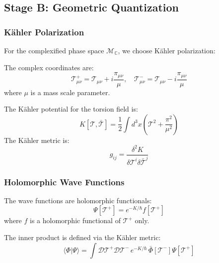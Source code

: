 \subsection{Stage B: Geometric Quantization}
\label{subsec:stageB_geometric}

\subsubsection{Kähler Polarization}

For the complexified phase space $\mathcal{M}_\mathbb{C}$, we choose Kähler polarization:

\begin{definition}
The complex coordinates are:
\begin{equation}
    \mathcal{T}^+_{\mu\nu} = \mathcal{T}_{\mu\nu} + i \frac{\pi_{\mu\nu}}{\mu}, \quad \mathcal{T}^-_{\mu\nu} = \mathcal{T}_{\mu\nu} - i \frac{\pi_{\mu\nu}}{\mu}
\end{equation}
where $\mu$ is a mass scale parameter.
\end{definition}

\begin{theorem}
The Kähler potential for the torsion field is:
\begin{equation}
    K[\mathcal{T}, \bar{\mathcal{T}}] = \frac{1}{2} \int d^3x \left( \mathcal{T}^2 + \frac{\pi^2}{\mu^2} \right)
\end{equation}
The Kähler metric is:
\begin{equation}
    g_{ij} = \frac{\delta^2 K}{\delta \mathcal{T}^i \delta \bar{\mathcal{T}}^j}
\end{equation}
\end{theorem}

\subsubsection{Holomorphic Wave Functions}

\begin{theorem}
The wave functions are holomorphic functionals:
\begin{equation}
    \Psi[\mathcal{T}^+] = e^{-K/\hbar} f[\mathcal{T}^+]
\end{equation}
where $f$ is a holomorphic functional of $\mathcal{T}^+$ only.
\end{theorem}

The inner product is defined via the Kähler metric:
\begin{equation}
    \langle \Phi | \Psi \rangle = \int \mathcal{D}\mathcal{T}^+ \mathcal{D}\mathcal{T}^- \, e^{-K/\hbar} \, \bar{\Phi}[\mathcal{T}^-] \Psi[\mathcal{T}^+]
\end{equation}

